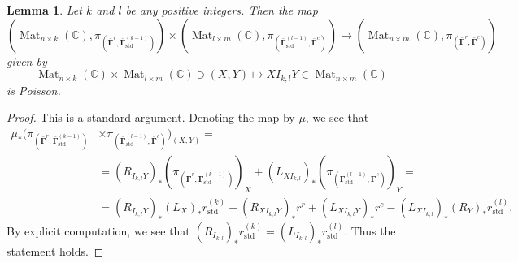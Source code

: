\documentclass[11pt]{article}
\newcommand{\bbg}{\bar{\mathbf{\Gamma}}}
\newcommand{\std}{\mathrm{std}}
\DeclareMathOperator{\Mat}{Mat}
\newtheorem{lemma}[theorem]{Lemma}%
\theoremstyle{definition}\newtheorem{definition}[theorem]{Definition}
\theoremstyle{definition}\newtheorem{remark}[theorem]{Remark}
\theoremstyle{remark}
\numberwithin{equation}{section}
\begin{document}
\begin{lemma}\label{lm:InmPoi}
    Let $k$ and $l$ be any positive integers. Then the map
    \begin{equation}\label{eq:InmPoi}
        (\Mat_{n\times k}(\mathbb{C}),\pi_{(\bbg^r,\bbg_{\std}^{(k-1)})}) \times (\Mat_{l\times m}(\mathbb{C}), \pi_{(\bbg_{\std}^{(l-1)},\bbg^c)}) \rightarrow (\Mat_{n\times m}(\mathbb{C}),\pi_{(\bbg^r,\bbg^c)})
    \end{equation}
    given by
    \begin{equation*}
        \Mat_{n\times k}(\mathbb{C}) \times \Mat_{l\times m}(\mathbb{C}) \ni (X,Y) \mapsto X I_{k,l} Y \in \Mat_{n\times m}(\mathbb{C})
    \end{equation*}
    is Poisson.
\end{lemma}
\begin{proof}
    This is a standard argument. Denoting the map by $\mu$, we see that
    \begin{equation*}\begin{split}
        \mu_*(\pi_{(\bbg^r,\bbg_{\std}^{(k-1)})}&\times \pi_{(\bbg_{\std}^{(l-1)},\bbg^c)})_{(X,Y)} = \\&=  (R_{I_{k,l}Y})_*(\pi_{(\bbg^r,\bbg_{\std}^{(k-1)})})_X + (L_{XI_{k,l}})_*(\pi_{(\bbg_{\std}^{(l-1)},\bbg^c)})_Y =  \\ &= (R_{I_{k,l}Y})_*(L_X)_*r_{\std}^{(k)} - (R_{XI_{k,l}Y})_*r^r + (L_{XI_{k,l}Y})_*r^c - (L_{XI_{k,l}})_*(R_Y)_*r_{\std}^{(l)}.
        \end{split}
    \end{equation*}
    By explicit computation, we see that $(R_{I_{k,l}})_*r_{\std}^{(k)} = (L_{I_{k,l}})_*r_{\std}^{(l)}$. Thus the statement holds.
\end{proof}
\end{document}
